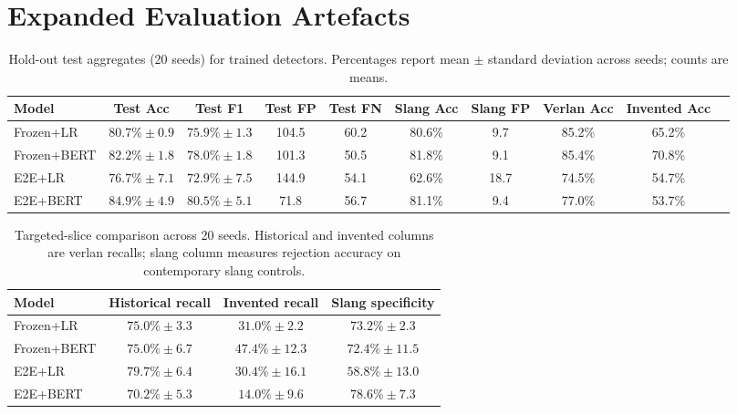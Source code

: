 \documentclass[12pt]{article}
\begin{document}
\appendix

\renewcommand{\thesection}{Appendix \Alph{section}}

\section{Expanded Evaluation Artefacts}

\begin{table}[H]
    \centering
    \footnotesize
    \begin{tabular}{lccccccccc}
        \hline
        Model & Test Acc & Test F1 & Test FP & Test FN & Slang Acc & Slang FP & Verlan Acc & Invented Acc \\
        \hline
        Frozen+LR & $80.7\%\pm0.9$ & $75.9\%\pm1.3$ & 104.5 & 60.2 & 80.6\% & 9.7 & 85.2\% & 65.2\% \\
        Frozen+BERT & $82.2\%\pm1.8$ & $78.0\%\pm1.8$ & 101.3 & 50.5 & 81.8\% & 9.1 & 85.4\% & 70.8\% \\
        E2E+LR & $76.7\%\pm7.1$ & $72.9\%\pm7.5$ & 144.9 & 54.1 & 62.6\% & 18.7 & 74.5\% & 54.7\% \\
        E2E+BERT & $84.9\%\pm4.9$ & $80.5\%\pm5.1$ & 71.8 & 56.7 & 81.1\% & 9.4 & 77.0\% & 53.7\% \\
        \hline
    \end{tabular}
    \caption{Hold-out test aggregates (20 seeds) for trained detectors. Percentages report mean $\pm$ standard deviation across seeds; counts are means.}
    \label{tab:appendix-holdout-aggregates}
\end{table}

\begin{table}[H]
    \centering
    \footnotesize
    \begin{tabular}{lccc}
        \hline
        Model & Historical recall & Invented recall & Slang specificity \\
        \hline
        Frozen+LR & $75.0\%\pm3.3$ & $31.0\%\pm2.2$ & $73.2\%\pm2.3$ \\
        Frozen+BERT & $75.0\%\pm6.7$ & $47.4\%\pm12.3$ & $72.4\%\pm11.5$ \\
        E2E+LR & $79.7\%\pm6.4$ & $30.4\%\pm16.1$ & $58.8\%\pm13.0$ \\
        E2E+BERT & $70.2\%\pm5.3$ & $14.0\%\pm9.6$ & $78.6\%\pm7.3$ \\
        \hline
    \end{tabular}
    \caption{Targeted-slice comparison across 20 seeds. Historical and invented columns are verlan recalls; slang column measures rejection accuracy on contemporary slang controls.}
    \label{tab:appendix-targeted-metrics}
\end{table}
\end{document}
